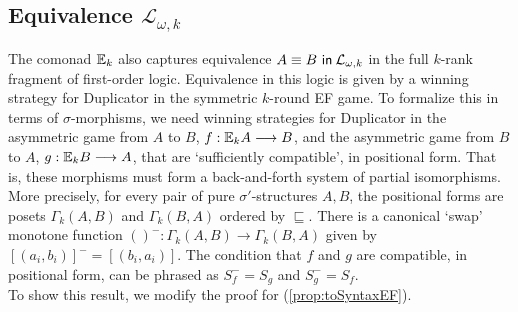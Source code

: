 \subsection{Equivalence $\mathcal{L}_{\omega,k}$}
The comonad ${\mathbb{E}_{k}}$ also captures equivalence ${A \equiv B \ \mathsf{in}\: \mathcal{L}_{\omega,k}}$ in the full $k$-rank fragment of first-order logic. Equivalence in this logic is given by a winning strategy for Duplicator in the symmetric $k$-round EF game. To formalize this in terms of $\sigma$-morphisms, we need winning strategies for Duplicator in the asymmetric game from $A$ to $B$, $f:{\mathbb{E}_{k}A} \longrightarrow B$, and the asymmetric game from $B$ to $A$, $g:{\mathbb{E}_{k}B} \longrightarrow A$, that are `sufficiently compatible', in positional form.  That is, these morphisms must form a back-and-forth system of partial isomorphisms. More precisely, for every pair of pure $\sigma'$-structures $A,B$, the positional forms are posets $\Gamma_{k}(A,B)$ and $\Gamma_{k}(B,A)$ ordered by $\sqsubseteq$. There is a canonical `swap' monotone function $()^{-}:\Gamma_{k}(A,B) \longrightarrow \Gamma_{k}(B,A)$ given by $[(a_{i},b_{i})]^{-} = [(b_{i},a_{i})]$. The condition that $f$ and $g$ are compatible, in positional form, can be phrased as $S_{f}^{-} = S_{g}$ and $S_{g}^{-} = S_{f}$. \\ 
To show this result, we modify the proof for (\ref{prop:toSyntaxEF}).  
